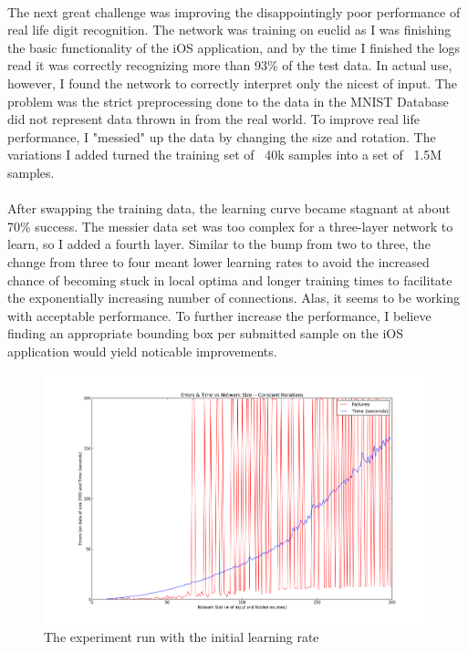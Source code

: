 \documentclass{article}
\begin{document}
    \paragraph{}The next great challenge was improving the disappointingly poor 
    performance of real life digit recognition. The network was training on euclid 
    as I was finishing the basic functionality of the iOS application, and by the 
    time I finished the logs read it was correctly recognizing more than 93\% of 
    the test data. In actual use, however, I found the network to correctly 
    interpret only the nicest of input. The problem was the strict preprocessing 
    done to the data in the MNIST Database did not represent data thrown in from
    the real world. To improve real life performance, I "messied" up the data by 
    changing the size and rotation. The variations I added turned the training set 
    of ~40k samples into a set of ~1.5M samples. 

    \paragraph{}After swapping the training data, the learning curve became 
    stagnant at about 70\% success. The messier data set was too complex for a 
    three-layer network to learn, so I added a fourth layer. Similar to the bump 
    from two to three, the change from three to four meant lower learning rates 
    to avoid the increased chance of becoming stuck in local optima and longer 
    training times to facilitate the exponentially increasing number of 
    connections. Alas, it seems to be working with acceptable performance. To 
    further increase the performance, I believe finding an appropriate bounding 
    box per submitted sample on the iOS application would yield noticable 
    improvements.

    \begin{figure}
        \centering
        \includegraphics[scale=0.4]{images/bad_learning.png}
        \caption{The experiment run with the initial learning rate}
        \label{badgraph}
    \end{figure}
\end{document}
